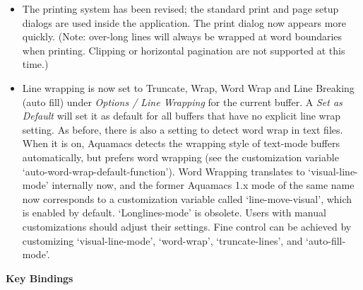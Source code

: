 \begin{itemize}
\item The printing system has been revised; the standard print and page setup dialogs are used inside the application.  The print dialog now appears more quickly.  (Note: over-long lines will always be wrapped at word boundaries when printing. Clipping or horizontal pagination are not supported at this time.)

\item Line wrapping is now set to Truncate, Wrap, Word Wrap and Line Breaking (auto fill) under \emph{Options / Line Wrapping} for the current buffer.  A \emph{Set as Default} will set it as default for all buffers that have no explicit line wrap setting.  As before, there is also a setting to detect word wrap in text files.  When it is on, Aquamacs detects the wrapping style of text-mode buffers automatically, but prefers word wrapping (see the customization variable `auto-word-wrap-default-function').
{\small Word Wrapping translates to `visual-line-mode' internally now, and the former Aquamacs 1.x mode of the same name now corresponds to a customization variable called `line-move-visual', which is enabled by default.  `Longlines-mode' is obsolete.   Users with manual customizations should adjust their settings.  Fine control can be achieved by customizing `visual-line-mode', `word-wrap', `truncate-lines', and `auto-fill-mode'.}

\end{itemize}



\textbf{Key Bindings}

